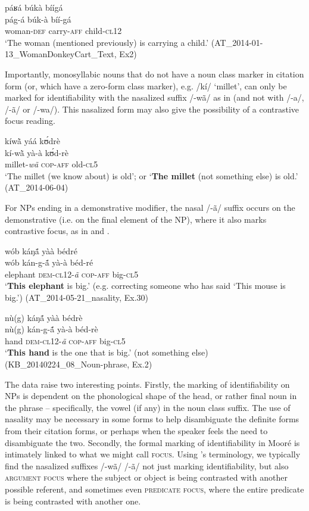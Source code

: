 \documentclass[output=paper]{langsci/langscibook}
\begin{document}
\ea\label{ex:teo:51}
\glll páʁá búkà bíígá\\
pág-á búk-à bíí-gá\\
woman-\textsc{def} carry-\textsc{aff} child-\textsc{cl12}\\
\glt ‘The woman (mentioned previously) is carrying a child.’ (AT\_2014-01-13\_WomanDonkeyCart\_Text, Ex2)
\z

Importantly, monosyllabic nouns that do not have a noun class marker in citation form (or, which have a zero-form class marker), e.g. /kí/ ‘millet’, can only be marked for identifiability with the nasalized suffix /-wã/ as in  (and not with /-a/, /-ã/ or /-wa/). This nasalized form may also give the possibility of a contrastive focus reading.

\ea\label{ex:teo:52}
\glll kíw\`{ã}  yáá k\'ʊdrè\\
kí-w\`{ã}  yà-à k\'ʊd-rè\\
millet-\textit{wã} \textsc{cop-aff} old-\textsc{cl5}\\
\glt ‘The millet (we know about) is old’; or ‘\textbf{The millet} (not something else) is old.’ (AT\_2014-06-04)
\z

For NPs ending in a demonstrative modifier, the nasal /-ã/ suffix occurs on the demonstrative (i.e. on the final element of the NP), where it also marks contrastive focus, as in  and .

\ea\label{ex:teo:53}
\glll wób káŋ\'{ã} yàà bédré\\
wób kán-g-\'{ã} yà-à béd-ré\\
elephant \textsc{dem-cl12}-\textit{ã} \textsc{cop-aff} big-\textsc{cl5}\\
\glt ‘\textbf{This elephant} is big.’ (e.g. correcting someone who has said ‘This mouse is big.’) (AT\_2014-05-21\_nasality, Ex.30)
\z

\ea\label{ex:teo:54}
\glll nù(g) káŋ\'{ã}  yàà bédrè\\
nù(g) kán-g-\'{ã}  yà-à béd-rè\\
hand \textsc{dem-cl12}-\textit{ã} \textsc{cop-aff} big-\textsc{cl5}\\
\glt ‘\textbf{This hand} is the one that is big.’ (not something else) (KB\_20140224\_08\_Noun-phrase, Ex.2)
\z

The data raise two interesting points. Firstly, the marking of identifiability on NPs is dependent on the phonological shape of the head, or rather final noun in the phrase – specifically, the vowel (if any) in the noun class suffix. The use of nasality may be necessary in some forms to help disambiguate the definite forms from their citation forms, or perhaps when the speaker feels the need to disambiguate the two. Secondly, the formal marking of identifiability in Mooré is intimately linked to what we might call \textsc{focus}. Using \cite{Lambrecht1994}'s terminology, we typically find the nasalized suffixes /-wã/ {\Tilde} /-ã/ not just marking identifiability, but also \textsc{argument focus} where the subject or object is being contrasted with another possible referent, and sometimes even \textsc{predicate focus}, where the entire predicate is being contrasted with another one.
\end{document}

